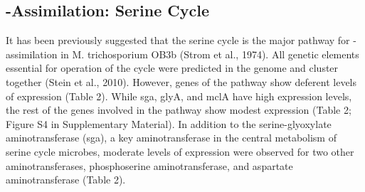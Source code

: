 \subsection{-Assimilation: Serine Cycle}
It has been previously suggested that the serine cycle is the major pathway for -assimilation in M. trichosporium OB3b (Strom et al., 1974).
All genetic elements essential for operation of the cycle were predicted in the genome and cluster together (Stein et al., 2010).
However, genes of the pathway show deferent levels of expression (Table 2).
While sga, glyA, and mclA have high expression levels, the rest of the genes involved in the pathway show modest expression (Table 2; Figure S4 in Supplementary Material).
In addition to the serine-glyoxylate aminotransferase (sga), a key aminotransferase in the central metabolism of serine cycle microbes, moderate levels of expression were observed for two other aminotransferases, phosphoserine aminotransferase, and aspartate aminotransferase (Table 2).

